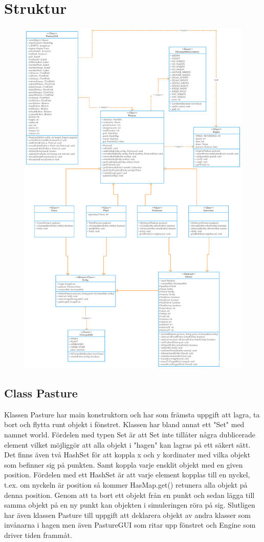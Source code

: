 \documentclass{article}
\begin{document}
\section{Struktur}
\begin{figure}[H]
  \centering
    \includegraphics[width=0.8\linewidth]{uml.png}
  \label{fig:1}
\end{figure}

\subsection{Class Pasture}
Klassen Pasture har main konstruktorn och har som främsta uppgift att lagra, ta bort och flytta runt objekt i fönstret.
Klassen har bland annat ett "Set" med namnet world. Fördelen med typen Set är att Set inte tillåter några dublicerade element
vilket möjliggör att alla objekt i "hagen" kan lagras på ett säkert sätt. Det finns även två HashSet för att koppla x och y kordinater med vilka objekt som befinner sig på punkten.
Samt  koppla varje ensklit objekt med en given position. Fördelen med ett HashSet är att varje element kopplas till en nyckel, t.ex.
om nyckeln är position så kommer HasMap.get() retunera alla objekt på denna position.
Genom att ta bort ett objekt från en punkt och sedan lägga till samma objekt på en ny punkt kan objekten i simuleringen röra på sig.
Slutligen har även klassen Pasture till uppgift att deklarera objekt av andra klasser som invånarna i hagen men även PastureGUI som ritar upp fönstret och Engine som driver tiden frammåt.
\end{document}
